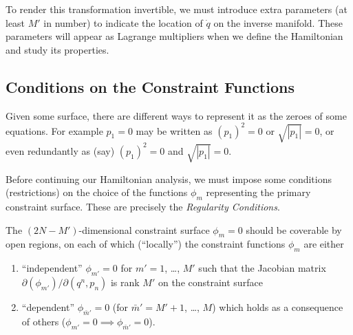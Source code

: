 
To render this transformation invertible, we must introduce extra
parameters (at least $M'$ in number) to indicate the location of
$\dot{q}$ on the inverse manifold. These parameters will appear as
Lagrange multipliers when we define the Hamiltonian and study its
properties.

\subsection{Conditions on the Constraint Functions}

\label{n:regularity-conditions:motivating-example}
Given some surface, there are different ways to represent it as the
zeroes of some equations. For example $p_{1}=0$ may be written as
$(p_{1})^{2}=0$ or $\sqrt{|p_{1}|}=0$, or even redundantly as (say)
$(p_{1})^{2}=0$ and $\sqrt{|p_{1}|}=0$.

Before continuing our Hamiltonian analysis, we must impose some
conditions (restrictions) on the choice of the functions $\phi_{m}$
representing the primary constraint surface. These are precisely the
\emph{Regularity Conditions}.

The $(2N-M')$-dimensional constraint surface $\phi_{m}=0$ should be
coverable by open regions, on each of which (``locally'') the
constraint functions $\phi_{m}$ are either
\begin{enumerate}
  \item ``independent'' $\phi_{m'}=0$ for $m'=1$, \dots, $M'$ such that
    the Jacobian matrix $\partial(\phi_{m'})/\partial(q^{n},p_{n})$ is
    rank $M'$ on the constraint surface
  \item ``dependent'' $\phi_{\bar{m}'}=0$ (for $\bar{m}'=M'+1$, \dots,
    $M$) which holds as a consequence of others ($\phi_{m'}=0\implies\phi_{\bar{m}'}=0$).
\end{enumerate}

